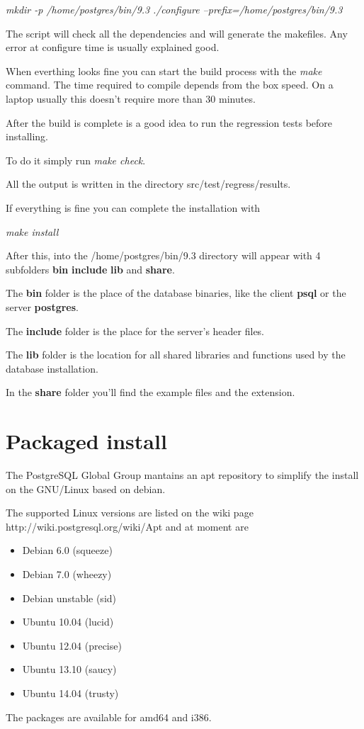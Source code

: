 \textit{mkdir -p /home/postgres/bin/9.3} 
\textit{./configure --prefix=/home/postgres/bin/9.3}

The script will check all the dependencies and will generate the makefiles. 
Any error at configure time is usually explained good.

When everthing looks fine you can start the build process with the \textit{make} command.
The time required to compile depends from the box speed. On a laptop usually this doesn't require more than 30 minutes.

After the build is complete is a good idea to run the regression tests before installing.

To do it simply run \textit{make check}.

All the output is written in the directory src/test/regress/results. 

If everything is fine you can complete the installation with

\textit{make install}

After this, into the /home/postgres/bin/9.3 directory will appear with 4 subfolders 
\textbf{bin} \textbf{include} \textbf{lib} and \textbf{share}.

The \textbf{bin} folder is the place of the database binaries, like the client \textbf{psql} or the server \textbf{postgres}. 

The \textbf{include} folder is the place for the server's header files.

The \textbf{lib} folder is the location for all shared libraries and functions used by the database installation.

In the \textbf{share} folder you'll find the example files and the extension. 


\section{Packaged install}
\label{sec:DEBIAN_INSTALL}

The PostgreSQL Global Group mantains an apt repository to simplify the install on the GNU/Linux based on debian.

The supported Linux versions are listed on the wiki page http://wiki.postgresql.org/wiki/Apt and at moment are

\begin{itemize}
 \item Debian 6.0 (squeeze)
 \item Debian 7.0 (wheezy)
 \item Debian unstable (sid) 
 \item Ubuntu 10.04 (lucid)
 \item Ubuntu 12.04 (precise)
 \item Ubuntu 13.10 (saucy)
 \item Ubuntu 14.04 (trusty) 
\end{itemize}
The packages are available for amd64 and i386.

